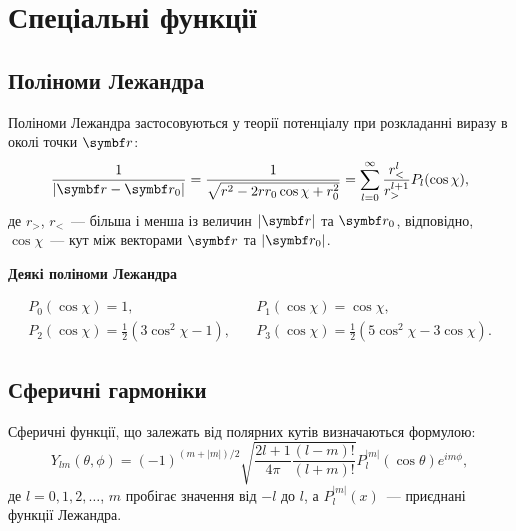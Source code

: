 

\section{Спеціальні функції}\label{sec:special_functions}

\subsection{Поліноми Лежандра}\label{Polinoms}

Поліноми Лежандра застосовуються у теорії потенціалу при розкладанні виразу в околі точки $\vect{r}$:
\begin{equation*}
    \frac{1}{|\vect{r} - \vect{r}_0|} = \frac{1}{\sqrt{r^2 - 2rr_0 \cos\chi + r_0^2 }}  =  \sum\limits_{l = 0}^{\infty} \frac{r^l_<}{r^{l+1}_>} P_l(\cos\chi),
\end{equation*}
де $r_>$, $r_<$~--- більша і менша із величин $|\vect{r}|$ та $\vect{r}_0$, відповідно, $\cos\chi$~--- кут між векторами $\vect{r}$ та $|\vect{r}_0|$.

\medskip%
\textbf{Деякі поліноми Лежандра}

\begin{align*}
P_{0}(\cos\chi)  = 1, &\quad P_{1}(\cos\chi)  = \cos\chi, \\
P_{2}(\cos\chi)  = \frac {1}{2}(3\cos^2\chi-1), &\quad P_{3}(\cos\chi)  = \frac {1}{2}(5\cos^2\chi-3\cos\chi).
\end{align*}

\subsection{Сферичні гармоніки}\label{Spherical_Harmonics}

Сферичні функції, що залежать від полярних кутів визначаються формулою:
\begin{equation*}
    Y_{lm}(\theta,\phi) = (-1)^{(m+|m|)/2} \sqrt{\frac{2l+1}{4\pi}\frac{(l-m)!}{(l+m)!}}P_l^{|m|}(\cos \theta) e^{im\phi},
\end{equation*}
де $l = 0,1,2, \ldots$, $m$ пробігає значення від $-l$ до $l$, а $P_l^{|m|}(x)$~--- приєднані функції Лежандра.


